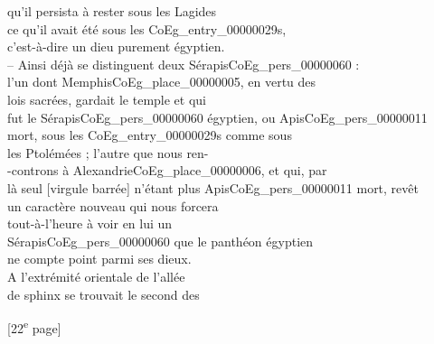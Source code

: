 \documentclass{book}
\begin{document}
{\begin{paracol}{2}
qu’il persista à rester sous les Lagides\\
ce qu’il avait été sous les \Glspl{CoEg_entry_00000029},\\
c’est-à-dire un dieu purement égyptien.\\
– Ainsi déjà se distinguent deux Sérapis\gls{CoEg_pers_00000060} :\\
l’un dont Memphis\gls{CoEg_place_00000005}, en vertu des\\
lois sacrées, gardait le temple et qui\\
fut le Sérapis\gls{CoEg_pers_00000060} égyptien, ou Apis\gls{CoEg_pers_00000011}\\
mort, sous les \Glspl{CoEg_entry_00000029} comme sous\\
les Ptolémées ; l’autre que nous ren-\\
-controns à Alexandrie\gls{CoEg_place_00000006}, et qui, par\\
là seul [virgule barrée] n’étant plus Apis\gls{CoEg_pers_00000011} mort, revêt\\
un caractère nouveau qui nous forcera\\
tout-à-l’heure à voir en lui un\\
Sérapis\gls{CoEg_pers_00000060} que le panthéon égyptien\\
ne compte point parmi ses dieux.\\
\indent A l’extrémité orientale de l’allée\\
de sphinx se trouvait le second des
\end{paracol}

{\footnotesize\begin{center} {[22\textsuperscript{e} page]}\end{center}}

}
\end{document}
